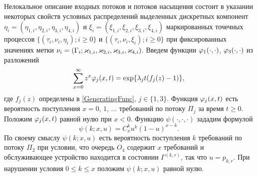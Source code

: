 \documentclass[a4paper,12pt,russian]{extarticle}
\newcommand{\ga}[1]{\Gamma^{\left( #1 \right)} }
\begin{document}
Нелокальное описание входных потоков и потоков насыщения состоит в указании некоторых свойств условных распределений выделенных дискретных компонент $\eta_i=(\eta_{1,i},\eta_{2,i}, \eta_{3,i}, \eta_{4,i})$ и $\xi_i=(\xi_{1,i}, \xi_{2,i}, \xi_{3,i}, \xi_{4,i})$ маркированных точечных процессов \linebreak $\{(\tau_i, \nu_i, \eta_i); i\geqslant 0\}$ и $\{(\tau_i, \nu_i, \xi_i); i\geqslant 0\}$ при фиксированных значениях метки $\nu_i = (\Gamma_i;\varkappa_{1,i},\varkappa_{2,i},\varkappa_{3,i},\varkappa_{4,i})$. 
Введем функции $\varphi_1(\cdot,\cdot)$, $\varphi_3(\cdot,\cdot)$ из разложений 
\begin{equation*}
\sum_{x=0}^{\infty} z^x\varphi_j(x,t) = \exp\{\lambda_j t (f_j(z)-1)\},
\end{equation*}
где $f_j(z)$ определены в \eqref{GeneratingFunc}, $j \in \{1,3\}$. Функция $\varphi_j(x,t)$ есть вероятность поступления $x=0$, $1$, $\ldots$ требований по потоку $\Pi_j$ за время $t \geqslant 0$. Положим $\varphi_j(x,t)$ равной нулю при $x < 0$. Функцию $\psi(\cdot,\cdot,\cdot)$ зададим формулой
\begin{equation*}
\psi(k;x,u)=C_x^k u^k (1-u)^{x-k}.
\end{equation*}
По своему смыслу $\psi(k;x,u)$ есть вероятность поступления $k$ требований по потоку $\Pi_2$ при условии, что очередь $O_4$ содержит $x$ требований и обслуживающее устройство находится в состоянии $\ga{k,r}$, так что $u=p_{k,r}$. При нарушении условия $ 0\leqslant k \leqslant x$ положим $\psi(k;x,u)$ равной нулю.
\end{document}
